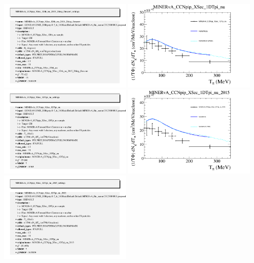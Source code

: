\documentclass{article}
\begin{document}
\includegraphics[width=0.49\textwidth]{figures/nuisance_MINERvA_CCNpip_XSec_1Dth_nu_2015_20deg_fluxcorr_info.png}
\centering
\includegraphics[width=0.49\textwidth]{figures/nuisance_MINERvA_CCNpip_XSec_1DTpi_nu_comp.png}
\includegraphics[width=0.49\textwidth]{figures/nuisance_MINERvA_CCNpip_XSec_1DTpi_nu_info.png}
\centering
\includegraphics[width=0.49\textwidth]{figures/nuisance_MINERvA_CCNpip_XSec_1DTpi_nu_2015_comp.png}
\includegraphics[width=0.49\textwidth]{figures/nuisance_MINERvA_CCNpip_XSec_1DTpi_nu_2015_info.png}
\end{document}
